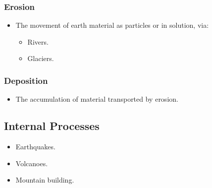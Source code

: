 \documentclass[12pt]{article}
\begin{document}
\subsubsection*{Erosion}
\begin{itemize}
    \item The movement of earth material as particles or in solution, via:
    \begin{itemize}
        \item Rivers.
        \item Glaciers.
    \end{itemize}
\end{itemize}

\subsubsection*{Deposition}
\begin{itemize}
    \item The accumulation of material transported by erosion.
\end{itemize}

\subsection*{Internal Processes}
\begin{itemize}
    \item Earthquakes.
    \item Volcanoes.
    \item Mountain building.
\end{itemize}
\end{document}
